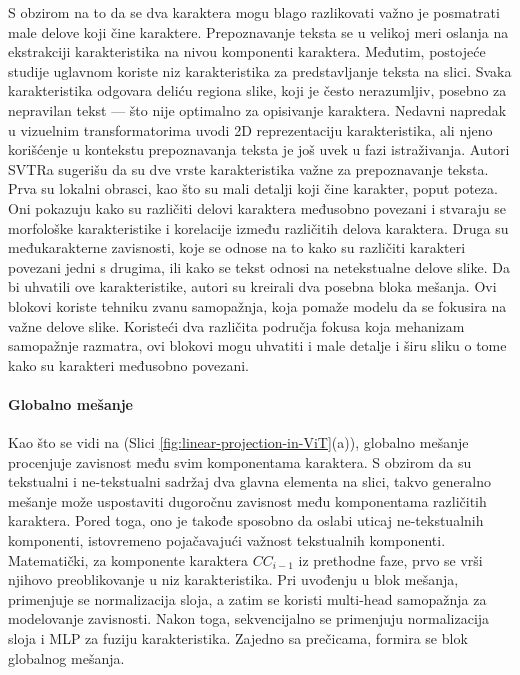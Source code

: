 \documentclass[a4paper,12pt]{article}
\begin{document}
	S obzirom na to da se dva karaktera mogu blago razlikovati važno je posmatrati male delove koji čine karaktere. Prepoznavanje teksta se u velikoj meri oslanja na ekstrakciji karakteristika na nivou komponenti karaktera. Međutim, postojeće studije uglavnom koriste niz karakteristika za predstavljanje teksta na slici. Svaka karakteristika odgovara deliću regiona slike, koji je često nerazumljiv, posebno za nepravilan tekst — što nije optimalno za opisivanje karaktera. Nedavni napredak u vizuelnim transformatorima uvodi 2D reprezentaciju karakteristika, ali njeno korišćenje u kontekstu prepoznavanja teksta je još uvek u fazi istraživanja. Autori SVTRa sugerišu da su dve vrste karakteristika važne za prepoznavanje teksta. Prva su lokalni obrasci, kao što su mali detalji koji čine karakter, poput poteza. Oni pokazuju kako su različiti delovi karaktera međusobno povezani i stvaraju se morfološke karakteristike i korelacije između različitih delova karaktera. Druga su međukarakterne zavisnosti, koje se odnose na to kako su različiti karakteri povezani jedni s drugima, ili kako se tekst odnosi na netekstualne delove slike. Da bi uhvatili ove karakteristike, autori su kreirali dva posebna bloka mešanja. Ovi blokovi koriste tehniku zvanu samopažnja, koja pomaže modelu da se fokusira na važne delove slike. Koristeći dva različita područja fokusa koja mehanizam samopažnje razmatra, ovi blokovi mogu uhvatiti i male detalje i širu sliku o tome kako su karakteri međusobno povezani.
	
	\paragraph{Globalno mešanje}
	Kao što se vidi na (Slici \ref{fig:linear-projection-in-ViT}(a)), globalno mešanje procenjuje zavisnost među svim komponentama karaktera. S obzirom da su tekstualni i ne-tekstualni sadržaj dva glavna elementa na slici, takvo generalno mešanje može uspostaviti dugoročnu zavisnost među komponentama različitih karaktera. Pored toga, ono je takođe sposobno da oslabi uticaj ne-tekstualnih komponenti, istovremeno pojačavajući važnost tekstualnih komponenti. Matematički, za komponente karaktera \(CC_{i-1}\) iz prethodne faze, prvo se vrši njihovo preoblikovanje u niz karakteristika. Pri uvođenju u blok mešanja, primenjuje se normalizacija sloja, a zatim se koristi multi-head samopažnja za modelovanje zavisnosti. Nakon toga, sekvencijalno se primenjuju normalizacija sloja i MLP za fuziju karakteristika.  Zajedno sa prečicama, formira se blok globalnog mešanja.
	
\end{document}
